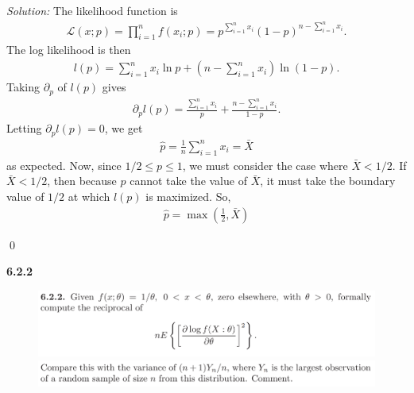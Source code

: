 \documentclass{book}
\theoremstyle{definition}
\newcommand{\p}{\partial}
\newcommand{\lag}{\mathcal{L}}
\newcommand{\f}[2]{\frac{#1}{#2}}
\newcommand{\lp}{\left(}
\newcommand{\rp}{\right)}
\begin{document}
\noindent \textit{Solution:} The likelihood function is 
\begin{align}
\lag(x;p) = \prod^n_{i=1}f(x_i;p) = p^{\sum_{i=1}^n x_i}(1-p)^{n-\sum^n_{i=1}x_i}.
\end{align}
The log likelihood is then
\begin{align}
l(p) = \sum_{i=1}^n x_i \ln p + \lp n - \sum^n_{i=1}x_i \rp \ln (1-p).
\end{align}
Taking $\p_p$ of $l(p)$ gives
\begin{align}
\p_p l(p) = \f{\sum^n_{i=1}x_i}{p} + \f{n - \sum^n_{i=1}x_i}{1-p}.
\end{align}
Letting $\p_p l(p) = 0$, we get
\begin{align}
\hat{p} = \f{1}{n}\sum^n_{i=1}x_i = \bar{X}
\end{align}
as expected. Now, since $1/2 \leq p \leq 1$, we must consider the case where $\bar{X} < 1/2$. If $\bar{X} < 1/2$, then because $p$ cannot take the value of $\bar{X}$, it must take the boundary value of $1/2$ at which $l(p)$ is maximized. So, 
\begin{align}
\boxed{\hat{p} = \max \lp \f{1}{2},\bar{X} \rp}
\end{align}

\qed











\newpage
\noindent \textbf{6.2.2}
\begin{figure}[!htb]
	\centering
	\includegraphics[scale=0.25]{622a}
	\includegraphics[scale=0.25]{622b}
\end{figure}
\end{document}
